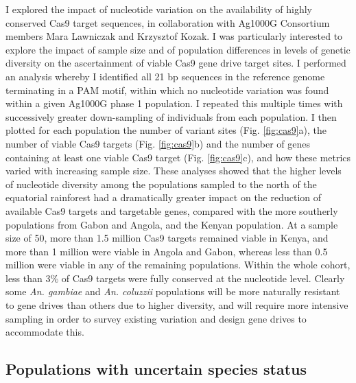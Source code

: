 \documentclass[a4paper,11pt,abstracton,hidelinks]{scrartcl}
\begin{document}
I explored the impact of nucleotide variation on the availability of highly conserved Cas9 target sequences, in collaboration with Ag1000G Consortium members Mara Lawniczak and Krzysztof Kozak.
%
I was particularly interested to explore the impact of sample size and of population differences in levels of genetic diversity on the ascertainment of viable Cas9 gene drive target sites.
%
I performed an analysis whereby I identified all 21 bp sequences in the reference genome terminating in a PAM motif, within which no nucleotide variation was found within a given Ag1000G phase 1 population.
%
I repeated this multiple times with successively greater down-sampling of individuals from each population.
%
I then plotted for each population the number of variant sites (Fig. \ref{fig:cas9}a), the number of viable Cas9 targets (Fig. \ref{fig:cas9}b) and the number of genes containing at least one viable Cas9 target (Fig. \ref{fig:cas9}c), and how these metrics varied with increasing sample size.
%
These analyses showed that the higher levels of nucleotide diversity among the populations sampled to the north of the equatorial rainforest had a dramatically greater impact on the reduction of available Cas9 targets and targetable genes, compared with the more southerly populations from Gabon and Angola, and the Kenyan population.
%
At a sample size of 50, more than 1.5 million Cas9 targets remained viable in Kenya, and more than 1 million were viable in Angola and Gabon, whereas less than 0.5 million were viable in any of the remaining populations.
%
Within the whole cohort, less than 3\% of Cas9 targets were fully conserved at the nucleotide level.
%
Clearly some \textit{An. gambiae} and \textit{An. coluzzii} populations will be more naturally resistant to gene drives than others due to higher diversity, and will require more intensive sampling in order to survey existing variation and design gene drives to accommodate this.


\subsection{Populations with uncertain species status}\label{subsec:species}
\end{document}
